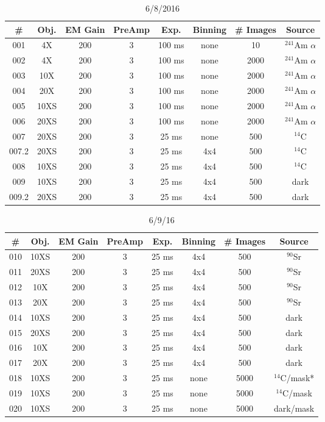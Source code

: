 \documentclass[12pt]{amsart}
\begin{document}
\begin{table}[!htbp]
	\centering
	\caption{6/8/2016}
	\label{tab:table1}
	\hspace*{-1cm}
	\begin{tabular}{cccccccc}
		\toprule
		\# & Obj. & EM Gain & PreAmp & Exp. & Binning & \# Images & Source\\
		\midrule
		001 & 4X & 200 & 3 & 100 ms & none & 10 & $^{241}$Am $\alpha$\\
		002 & 4X & 200 & 3 & 100 ms & none & 2000 & $^{241}$Am $\alpha$\\
		003 & 10X & 200 & 3 & 100 ms & none & 2000 & $^{241}$Am $\alpha$\\
		004 & 20X & 200 & 3 & 100 ms & none & 2000 & $^{241}$Am $\alpha$\\
		005 & 10XS & 200 & 3 & 100 ms & none & 2000 & $^{241}$Am $\alpha$\\
		006 & 20XS & 200 & 3 & 100 ms & none & 2000 & $^{241}$Am $\alpha$\\
		007 & 20XS & 200 & 3 & 25 ms & none & 500 & $^{14}$C\\
		007.2 & 20XS & 200 & 3 & 25 ms & 4x4 & 500 & $^{14}$C\\
		008 & 10XS & 200 & 3 & 25 ms & 4x4 & 500 & $^{14}$C\\
		009 & 10XS & 200 & 3 & 25 ms & 4x4 & 500 & dark\\
		009.2 & 20XS & 200 & 3 & 25 ms & 4x4 & 500 & dark\\
		\bottomrule
	\end{tabular}
	\hspace*{-1cm}
\end{table}

\begin{table}[!htbp]
	\centering
	\caption{6/9/16}
	\label{tab:table2}
	\hspace*{-1cm}
	\begin{tabular}{cccccccc}
		\toprule
		\# & Obj. & EM Gain & PreAmp & Exp. & Binning & \# Images & Source\\
		\midrule
		010 & 10XS & 200 & 3 & 25 ms & 4x4 & 500 & $^{90}$Sr\\
		011 & 20XS & 200 & 3 & 25 ms & 4x4 & 500 & $^{90}$Sr\\
		012 & 10X & 200 & 3 & 25 ms & 4x4 & 500 & $^{90}$Sr\\
		013 & 20X & 200 & 3 & 25 ms & 4x4 & 500 & $^{90}$Sr\\
		014 & 10XS & 200 & 3 & 25 ms & 4x4 & 500 & dark\\
		015 & 20XS & 200 & 3 & 25 ms & 4x4 & 500 & dark\\
		016 & 10X & 200 & 3 & 25 ms & 4x4 & 500 & dark\\
		017 & 20X & 200 & 3 & 25 ms & 4x4 & 500 & dark\\
		018 & 10XS & 200 & 3 & 25 ms & none & 5000 & $^{14}$C/mask*\\
		019 & 10XS & 200 & 3 & 25 ms & none & 5000 & $^{14}$C/mask\\
		020 & 10XS & 200 & 3 & 25 ms & none & 5000 & dark/mask\\
		\bottomrule
	\end{tabular}
	\hspace*{-1cm}
\end{table}
\end{document}
